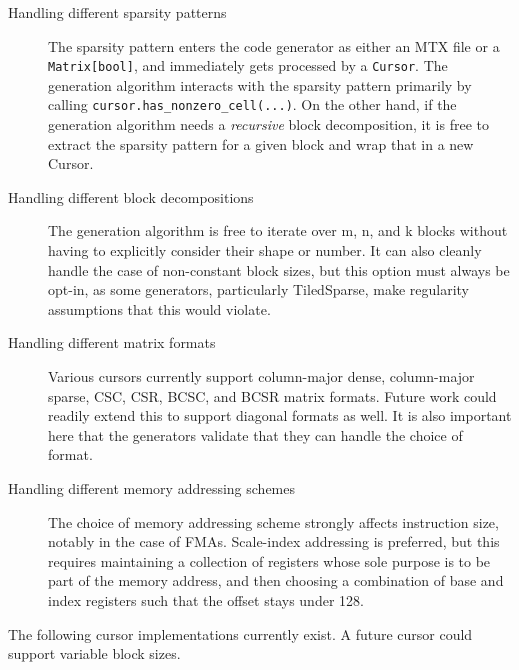     \begin{description}
        \item[Handling different sparsity patterns] The sparsity pattern enters the code generator as either an MTX file or a \texttt{Matrix[bool]}, and immediately gets processed by a \texttt{Cursor}. The generation algorithm interacts with the sparsity pattern primarily by calling \texttt{cursor.has_nonzero_cell(...)}. On the other hand, if the generation algorithm needs a \emph{recursive} block decomposition, it is free to extract the sparsity pattern for a given block and wrap that in a new Cursor. 

        \item[Handling different block decompositions] The generation algorithm is free to iterate over m, n, and k blocks without having to explicitly consider their shape or number. It can also cleanly handle the case of non-constant block sizes, but this option must always be opt-in, as some generators, particularly TiledSparse, make regularity assumptions that this would violate. 

        \item[Handling different matrix formats] Various cursors currently support column-major dense, column-major sparse, CSC, CSR, BCSC, and BCSR matrix formats. Future work could readily extend this to support diagonal formats as well. It is also important here that the generators validate that they can handle the choice of format. 

        \item[Handling different memory addressing schemes] The choice of memory addressing scheme strongly affects instruction size, notably in the case of FMAs. Scale-index addressing is preferred, but this requires maintaining a collection of registers whose sole purpose is to be part of the memory address,
        and then choosing a combination of base and index registers such that the offset stays under 128. 

    \end{description}

    The following cursor implementations currently exist. A future cursor could support variable block sizes.

